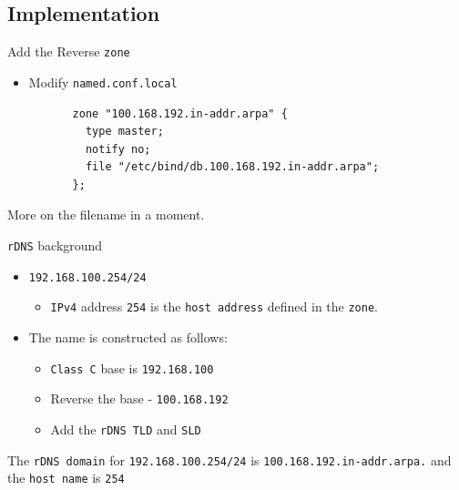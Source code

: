 \documentclass[xcolor=table]{beamer}
\begin{document}
\subsection{Implementation}
\begin{frame}[fragile]{Add the Reverse \texttt{zone}}
  \begin{itemize}
    \item Modify \texttt{named.conf.local}
  \end{itemize}
  \begin{tcolorbox}
    \lstset{
      basicstyle=\tiny\ttfamily,
    }
    \begin{lstlisting}
          zone "100.168.192.in-addr.arpa" {
            type master;
            notify no;
            file "/etc/bind/db.100.168.192.in-addr.arpa";
          };
    \end{lstlisting}
  \end{tcolorbox}
  \begin{tcolorbox}[title={\textbf{NOTE:}}]
    \begin{center}
      \scriptsize More on the filename in a moment.
    \end{center}
  \end{tcolorbox}
\end{frame}

\begin{frame}{\texttt{rDNS} background}
  \begin{itemize}
    \item \texttt{192.168.100.254/24} 
      \begin{itemize}
        \item \texttt{IPv4} address \texttt{254} is the \texttt{host address} defined in the \texttt{zone}.
      \end{itemize}
    \item The name is constructed as follows:
      \begin{itemize}
        \item \texttt{Class C}  base is \texttt{192.168.100}
        \item Reverse the base - \texttt{100.168.192}
        \item Add the \texttt{rDNS TLD} and \texttt{SLD}
      \end{itemize}
  \end{itemize}
  \begin{tcolorbox}
    \begin{center}
      The \texttt{rDNS domain} for \texttt{192.168.100.254/24} is \texttt{100.168.192.in-addr.arpa.} and the \texttt{host name} is \texttt{254}       
    \end{center}
  \end{tcolorbox}
\end{frame}
\end{document}
